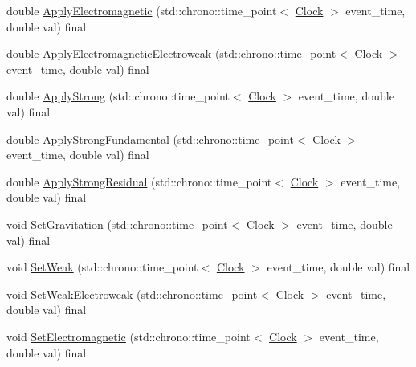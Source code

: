 \begin{DoxyCompactItemize}
double \mbox{\hyperlink{classCognitiveNetwork_ae590ecb77db0a876425b9b74bcfe2bce}{Apply\+Electromagnetic}} (std\+::chrono\+::time\+\_\+point$<$ \mbox{\hyperlink{universe_8h_a0ef8d951d1ca5ab3cfaf7ab4c7a6fd80}{Clock}} $>$ event\+\_\+time, double val) final
\item 
double \mbox{\hyperlink{classCognitiveNetwork_a9753f52c9e36ad44e9fac1d3e38a0770}{Apply\+Electromagnetic\+Electroweak}} (std\+::chrono\+::time\+\_\+point$<$ \mbox{\hyperlink{universe_8h_a0ef8d951d1ca5ab3cfaf7ab4c7a6fd80}{Clock}} $>$ event\+\_\+time, double val) final
\item 
double \mbox{\hyperlink{classCognitiveNetwork_a7a55750d3c42a277c4ffe04a87ab3b19}{Apply\+Strong}} (std\+::chrono\+::time\+\_\+point$<$ \mbox{\hyperlink{universe_8h_a0ef8d951d1ca5ab3cfaf7ab4c7a6fd80}{Clock}} $>$ event\+\_\+time, double val) final
\item 
double \mbox{\hyperlink{classCognitiveNetwork_af25bbd4f4d8f370cd2a48fd6db8302b9}{Apply\+Strong\+Fundamental}} (std\+::chrono\+::time\+\_\+point$<$ \mbox{\hyperlink{universe_8h_a0ef8d951d1ca5ab3cfaf7ab4c7a6fd80}{Clock}} $>$ event\+\_\+time, double val) final
\item 
double \mbox{\hyperlink{classCognitiveNetwork_a8b60fdb81d89a3a74d6c06cb29e7aad3}{Apply\+Strong\+Residual}} (std\+::chrono\+::time\+\_\+point$<$ \mbox{\hyperlink{universe_8h_a0ef8d951d1ca5ab3cfaf7ab4c7a6fd80}{Clock}} $>$ event\+\_\+time, double val) final
\item 
void \mbox{\hyperlink{classCognitiveNetwork_af9f082a70f0cc25a3f818d9eace5a527}{Set\+Gravitation}} (std\+::chrono\+::time\+\_\+point$<$ \mbox{\hyperlink{universe_8h_a0ef8d951d1ca5ab3cfaf7ab4c7a6fd80}{Clock}} $>$ event\+\_\+time, double val) final
\item 
void \mbox{\hyperlink{classCognitiveNetwork_ab39c9eed50da6d3630c4498ae64b804e}{Set\+Weak}} (std\+::chrono\+::time\+\_\+point$<$ \mbox{\hyperlink{universe_8h_a0ef8d951d1ca5ab3cfaf7ab4c7a6fd80}{Clock}} $>$ event\+\_\+time, double val) final
\item 
void \mbox{\hyperlink{classCognitiveNetwork_a116f6818986a622e4a318857859e2495}{Set\+Weak\+Electroweak}} (std\+::chrono\+::time\+\_\+point$<$ \mbox{\hyperlink{universe_8h_a0ef8d951d1ca5ab3cfaf7ab4c7a6fd80}{Clock}} $>$ event\+\_\+time, double val) final
\item 
void \mbox{\hyperlink{classCognitiveNetwork_a31764cd5746369d16b45f2ff74806a0b}{Set\+Electromagnetic}} (std\+::chrono\+::time\+\_\+point$<$ \mbox{\hyperlink{universe_8h_a0ef8d951d1ca5ab3cfaf7ab4c7a6fd80}{Clock}} $>$ event\+\_\+time, double val) final

\end{DoxyCompactItemize}
